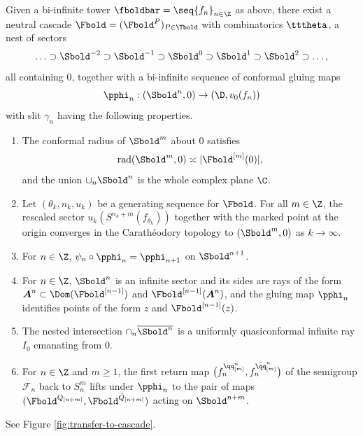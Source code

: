 \documentclass{amsart}
\begin{document}
\begin{proposition}
\label{prop:trans-sectors}
    Given a bi-infinite tower $\fboldbar = \seq{ f_n }_{n \in \Z}$ as above, there exist a neutral cascade $\Fbold = (\Fbold^P)_{P \in \Tbold}$ with combinatorics $\tttheta$, a nest of sectors 
    \[
    \ldots \supset \Sbold^{-2} \supset \Sbold^{-1} \supset \Sbold^0 \supset \Sbold^1 \supset \Sbold^2 \supset \ldots,
    \]
    all containing $0$, together with a bi-infinite sequence of conformal gluing maps 
    \[
    \pphi_n: (\Sbold^n,0) \to (\D, v_0(f_n))
    \]
    with slit $\gamma_n$ having the following properties. 
    \begin{enumerate}
        \item The conformal radius of $\Sbold^m$ about $0$ satisfies
    \[
        \textnormal{rad}(\Sbold^m,0) \asymp |\Fbold^{[m]}(0)|,
    \]
        and the union $\cup_n \Sbold^n$ is the whole complex plane $\C$.
        \item Let $(\theta_k, n_k, u_k)$ be a generating sequence for $\Fbold$. 
        For all $m \in \Z$, the rescaled sector $u_k(S^{n_k+m}(f_{\theta_k}))$ together with the marked point at the origin converges in the Carath\'eodory topology to $(\Sbold^m, 0)$ as $k \to \infty$.
        \item For $n \in \Z$, $\psi_n \circ \pphi_n = \pphi_{n+1}$ on $\Sbold^{n+1}$.
        \item For $n \in \Z$, $\Sbold^n$ is an infinite sector and its sides are rays of the form $\boldsymbol{A}^n \subset \Dom(\Fbold^{[n-1]})$ and $\Fbold^{[n-1]}(\boldsymbol{A}^n)$, and the gluing map $\pphi_n$ identifies points of the form $z$ and $\Fbold^{[n-1]}(z)$.
        \item The nested intersection $\cap_{n} \overline{\Sbold^n}$ is a uniformly quasiconformal infinite ray $I_0$ emanating from $0$.
        \item For $n \in \Z$ and $m \geq 1$, the first return map $\big( f_n^{\qq^n_{[m]}}, f_n^{\check{\qq}^n_{[m]}} \big)$ of the semigroup $\mathcal{F}_n$ back to $S_n^m$ lifts under $\pphi_n$ to the pair of maps $(\Fbold^{Q_{[n+m]}}, \Fbold^{\check{Q}_{[n+m]}})$ acting on $\Sbold^{n+m}$.
    \end{enumerate}
\end{proposition}

See Figure \ref{fig:transfer-to-cascade}.
\end{document}
